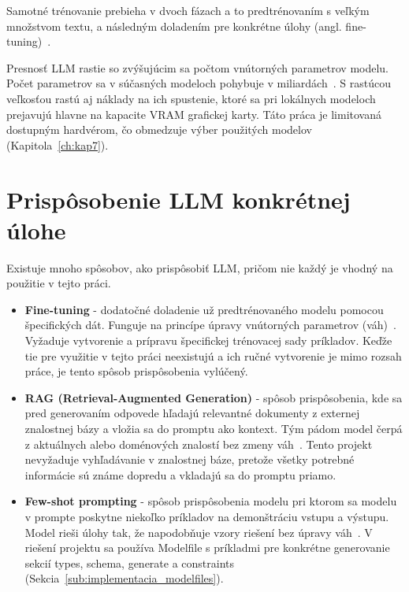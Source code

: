 Samotné trénovanie prebieha v dvoch fázach a to predtrénovaním s veľkým množstvom textu, a následným doladením pre konkrétne úlohy (angl. fine-tuning)~\cite{Naveed2024}.


    Presnosť LLM rastie so zvýšujúcim sa počtom vnútorných parametrov modelu. Počet parametrov sa v súčasných modeloch pohybuje v miliardách~\cite{Naveed2024}. S rastúcou veľkosťou rastú aj náklady na ich spustenie, ktoré sa pri lokálnych modeloch prejavujú hlavne na kapacite VRAM grafickej karty. Táto práca je limitovaná dostupným hardvérom, čo obmedzuje výber použitých modelov (Kapitola~\ref{ch:kap7}).

\section{Prispôsobenie LLM konkrétnej úlohe}
\label{sub:prisposobenie_llm}
Existuje mnoho spôsobov, ako prispôsobiť LLM, pričom nie každý je vhodný na použitie v tejto práci.

\begin{itemize}
    \item \textbf{Fine-tuning} - dodatočné doladenie už predtrénovaného modelu pomocou špecifických dát. Funguje na princípe úpravy vnútorných parametrov (váh)~\cite{Naveed2024}. Vyžaduje vytvorenie a prípravu špecifickej trénovacej sady príkladov. Keďže tie pre využitie v tejto práci neexistujú a ich ručné vytvorenie je mimo rozsah práce, je tento spôsob prispôsobenia vylúčený. 
    
    \item \textbf{RAG (Retrieval-Augmented Generation)} - spôsob prispôsobenia, kde sa pred generovaním odpovede hľadajú relevantné dokumenty z externej znalostnej bázy a vložia sa do promptu ako kontext. Tým pádom model čerpá z aktuálnych alebo doménových znalostí bez zmeny váh~\cite{Lewis2020}. Tento projekt nevyžaduje vyhľadávanie v znalostnej báze, pretože všetky potrebné informácie sú známe dopredu a vkladajú sa do promptu priamo.

    \item  \textbf{Few-shot prompting} - spôsob prispôsobenia modelu pri ktorom sa modelu v prompte poskytne niekoľko príkladov na demonštráciu vstupu a výstupu. Model rieši úlohy tak, že napodobňuje vzory riešení bez úpravy váh~\cite{Brown2020}. V riešení projektu sa používa Modelfile s príkladmi pre konkrétne generovanie sekcií types, schema, generate a constraints (Sekcia~\ref{sub:implementacia_modelfiles}).

\end{itemize}

